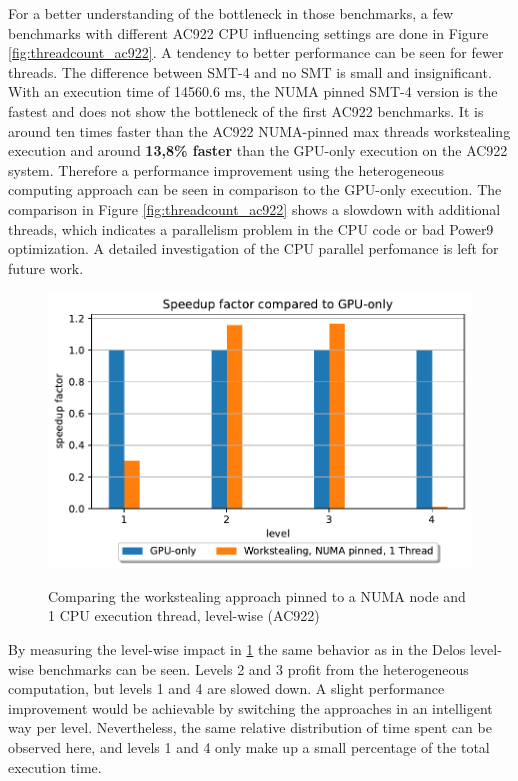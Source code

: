For a better understanding of the bottleneck in those benchmarks, a few benchmarks with different AC922 CPU influencing settings are done in Figure \ref{fig:threadcount_ac922}. A tendency to better performance can be seen for fewer threads. The difference between SMT-4 and no SMT is small and insignificant. With an execution time of 14560.6 ms, the NUMA pinned SMT-4 version is the fastest and does not show the bottleneck of the first AC922 benchmarks. It is around ten times faster than the AC922 NUMA-pinned max threads workstealing execution and around \textbf{13,8\% faster} than the GPU-only execution on the AC922 system. Therefore a performance improvement using the heterogeneous computing approach can be seen in comparison to the GPU-only execution. The comparison in Figure \ref{fig:threadcount_ac922} shows a slowdown with additional threads, which indicates a parallelism problem in the CPU code or bad Power9 optimization. A detailed investigation of the CPU parallel perfomance is left for future work.

\begin{figure}[H]
  \caption{Comparing the workstealing approach pinned to a NUMA node and 1 CPU execution thread, level-wise (AC922)}
  \includegraphics[width=\textwidth]{figures/ac922_levelwise.pdf}
  \centering
  \label{fig:levelwise_ac922}
\end{figure}

By measuring the level-wise impact in \ref{fig:levelwise_ac922} the same behavior as in the Delos level-wise benchmarks can be seen. Levels 2 and 3 profit from the heterogeneous computation, but levels 1 and 4 are slowed down. A slight performance improvement would be achievable by switching the approaches in an intelligent way per level. Nevertheless, the same relative distribution of time spent can be observed here, and levels 1 and 4 only make up a small percentage of the total execution time.


